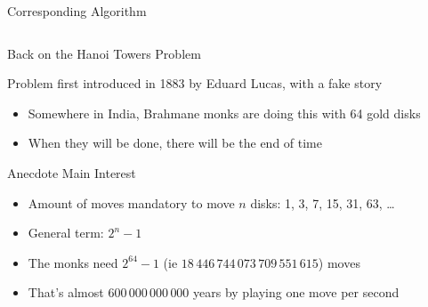 \begin{Coupe}
\begin{frame}[fragile]{Corresponding Algorithm}
{\begin{columns}
\begin{column}{.5\textwidth}
\begin{function}[H]

        \end{function}
    \end{column}
    \begin{column}{.48\textwidth}
    \end{column}
  \end{columns}
  }
\end{frame}
\begin{frame}{Back on the Hanoi Towers Problem}
  \begin{block}{Problem first introduced in 1883 by Eduard Lucas, with a fake
      story} 
    \begin{itemize}
    \item Somewhere in India, Brahmane monks are doing this with 64 gold disks
    \item When they will be done, there will be the end of time
    \end{itemize}    
  \end{block}


  \begin{block}{Anecdote Main Interest}
    \begin{itemize}
    \item Amount of moves mandatory to move $n$ disks: 1, 3, 7, 15, 31, 63,
      \ldots 
    \item General term: $2^n-1$
    \item The monks need $2^{64}-1$ (ie $18\,446\,744\,073\,709\,551\,615$) moves
    \item That's almost $600\,000\,000\,000$ years by playing one move per second
    \end{itemize}
  \end{block}


\end{frame}
\end{Coupe}
